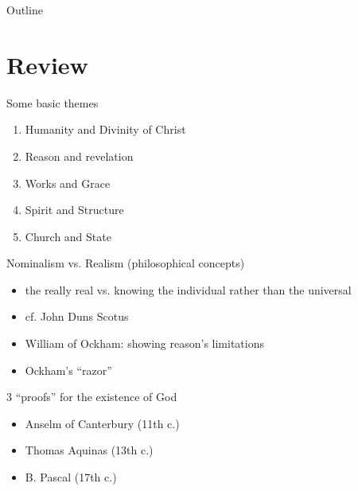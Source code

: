 

\maketitle
\begin{frame}{Outline}
\setcounter{tocdepth}{1}
\tableofcontents
\end{frame}

\section{Review}
\label{sec-1}
\begin{frame}[label=sec-1-1]{Some basic themes}
\begin{enumerate}
\item Humanity and Divinity of Christ
\item Reason and revelation
\item Works and Grace
\item Spirit and Structure
\item Church and State
\end{enumerate}
\end{frame}
\begin{frame}[label=sec-1-2]{Nominalism vs. Realism (philosophical concepts)}
\begin{itemize}
\item the really real vs. knowing the individual rather than the universal
\item cf. John Duns Scotus
\item William of Ockham: showing reason's limitations
\item Ockham's ``razor''
\end{itemize}
\end{frame}

\begin{frame}[label=sec-1-3]{3 ``proofs'' for the existence of God}
\begin{itemize}
\item Anselm of Canterbury (11th c.)
\item Thomas Aquinas (13th c.)
\item B. Pascal (17th c.)
\end{itemize}
\end{frame}

